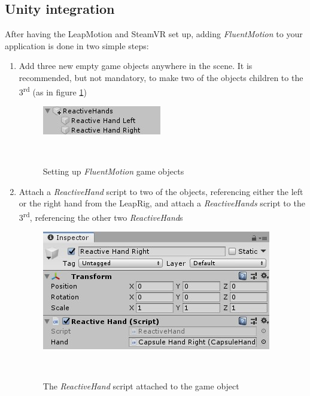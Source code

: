 \documentclass[chi_draft]{sigchi}
\def\fluentmotion{\textit{FluentMotion}}
\def\leap{LeapMotion}
\def\steamvr{SteamVR}
\begin{document}
\subsection{Unity integration}
After having the \leap{} and \steamvr{} set up, adding \fluentmotion{} to your application is done in two simple steps:

\begin{enumerate}
  \item Add three new empty game objects anywhere in the scene. It is recommended, but not mandatory, to make two of the objects children to the 3\textsuperscript{rd} (as in figure \ref{fig:figure6})
  \begin{figure}[H]
    \centering
    \includegraphics[width=0.9\columnwidth]{figures/FluentMotion_setup}
    \caption{Setting up \fluentmotion{} game objects}~\label{fig:figure6}
  \end{figure}

  \item Attach a \textit{ReactiveHand} script to two of the objects, referencing either the left or the right hand from the LeapRig, and attach a \textit{ReactiveHands} script to the 3\textsuperscript{rd}, referencing the other two \textit{ReactiveHand}s
  \begin{figure}[h]
    \centering
    \includegraphics[width=0.9\columnwidth]{figures/FluentMotion_reactive_hand}
    \caption{The \textit{ReactiveHand} script attached to the game object}~\label{fig:figure7}
  \end{figure}
\end{enumerate}
\end{document}

